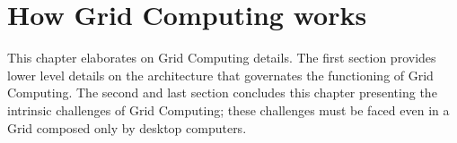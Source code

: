 \chapter{How Grid Computing works}
This chapter elaborates on Grid Computing details. The first section provides lower level details on the architecture that governates the functioning of Grid Computing. The second and last section concludes this chapter presenting the intrinsic challenges of Grid Computing; these challenges must be faced even in a Grid composed only by desktop computers.



